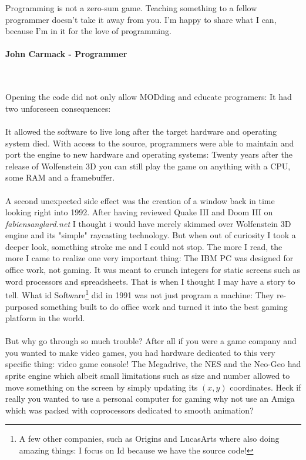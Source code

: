  \begin{fancyquotes}
   Programming is not a zero-sum game. Teaching something to a fellow programmer doesn't take it away from you. I'm happy to share what I can, because I'm in it for the love of programming.\\
   \\
\textbf{John Carmack - Programmer}
 \end{fancyquotes}\\
\\
Opening the code did not only allow MODding and educate programers: It had two unforeseen consequences:\\
\\
It allowed the software to live long after the target hardware and operating system died. With access to the source, programmers were able to maintain and port the engine to new hardware and operating systems: Twenty years after the release of Wolfenstein 3D you can still play the game on anything with a CPU, some RAM and a framebuffer. \\
\\
A second unexpected side effect was the creation of a window back in time looking right into 1992. After having reviewed Quake III and Doom III on \emph{fabiensanglard.net} I thought i would have merely skimmed over Wolfenstein 3D engine and its "simple" raycasting technology. But when out of curiosity I took a deeper look, something stroke me and I could not stop. The more I read, the more I came to realize one very important thing: The IBM PC was designed for office work, not gaming. It was meant to crunch integers for static screens such as word processors and spreadsheets. That is when I thought I may have a story to tell. What id Software\footnote{A few other companies, such as Origins and LucasArts where also doing amazing things: I focus on Id because we have the source code!} did in 1991 was not just program a machine: They re-purposed something built to do office work and turned it into the best gaming platform in the world.\\
\\
But why go through so much trouble? After all if you were a game company and you wanted to make video games, you had hardware dedicated to this very specific thing: video game console! The Megadrive, the NES and the Neo-Geo had sprite engine which albeit small limitations such as size and number allowed to move something on the screen by simply updating its $(x,y)$ coordinates. Heck if really you wanted to use a personal computer for gaming why not use an Amiga which was packed with coprocessors dedicated to smooth animation?\\
